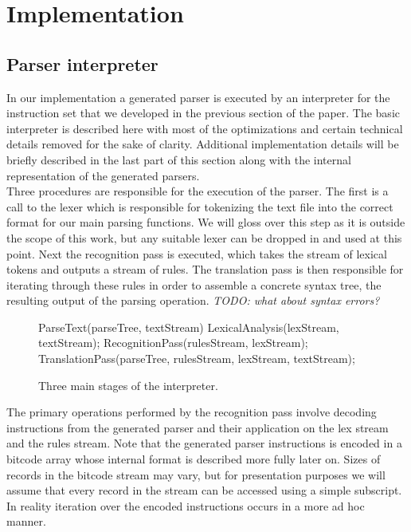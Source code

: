 \documentclass[a4paper,11pt]{article}
\begin{document}
\section{Implementation}
\subsection{Parser interpreter}

In our implementation a generated parser is executed by an interpreter for the instruction set that we developed in the previous section of the paper.
The basic interpreter is described here with most of the optimizations and certain technical details removed for the sake of clarity. 
Additional implementation details will be briefly described in the last part of this section along with the internal representation of the generated parsers.\\

Three procedures are responsible for the execution of the parser. 
The first is a call to the lexer which is responsible for tokenizing the text file into the correct format for our main parsing functions.
We will gloss over this step as it is outside the scope of this work, but any suitable lexer can be dropped in and used at this point.
Next the recognition pass is executed, which takes the stream of lexical tokens and outputs a stream of rules. 
The translation pass is then responsible for iterating through these rules in order to assemble a concrete syntax tree, the resulting output of the parsing operation.
\emph{TODO: what about syntax errors?}

\begin{figure}[!ht]
\begin{center}
\begin{gcl}
\PROC ParseText(parseTree, textStream)
LexicalAnalysis(lexStream, textStream);
RecognitionPass(rulesStream, lexStream);
TranslationPass(parseTree, rulesStream, lexStream, textStream);
\CORP
\end{gcl}
\caption{Three main stages of the interpreter.}
\end{center}
\end{figure}

The primary operations performed by the recognition pass involve decoding instructions from the generated parser and their application on the lex stream and the rules stream. 
Note that the generated parser instructions is encoded in a bitcode array whose internal format is described more fully later on.
Sizes of records in the bitcode stream may vary, but for presentation purposes we will assume that every record in the stream can be accessed using a simple subscript.
In reality iteration over the encoded instructions occurs in a more ad hoc manner.
\end{document}
